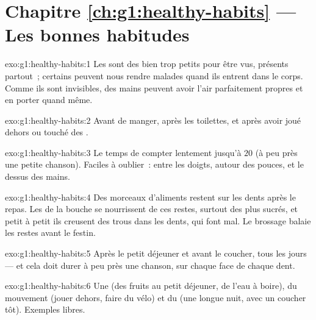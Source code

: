\section*{Chapitre \ref{ch:g1:healthy-habits} --- Les bonnes habitudes}

\begin{solution}{exo:g1:healthy-habits:1}
Les  sont des  bien trop petits pour être vus,
présents partout~; certains peuvent nous rendre malades quand ils
entrent dans le corps. Comme ils sont invisibles, des mains peuvent
avoir l'air parfaitement propres et en porter quand même.
\end{solution}

\begin{solution}{exo:g1:healthy-habits:2}
Avant de manger, après les toilettes, et après avoir joué dehors ou
touché des .
\end{solution}

\begin{solution}{exo:g1:healthy-habits:3}
Le temps de compter lentement jusqu'à $20$ (à peu près une petite
chanson). Faciles à oublier~: entre les doigts, autour des pouces,
et le dessus des mains.
\end{solution}

\begin{solution}{exo:g1:healthy-habits:4}
Des morceaux d'aliments restent sur les dents après le repas. Les
 de la bouche se nourrissent de ces restes, surtout des plus
sucrés, et petit à petit ils creusent des trous dans les dents, qui
font mal. Le brossage balaie les restes avant le festin.
\end{solution}

\begin{solution}{exo:g1:healthy-habits:5}
Après le petit déjeuner et avant le coucher, tous les jours --- et
cela doit durer à peu près une chanson, sur chaque face de chaque
dent.
\end{solution}

\begin{solution}{exo:g1:healthy-habits:6}
Une  (des fruits au petit déjeuner, de l'eau à
boire), du mouvement (jouer dehors, faire du vélo) et du 
(une longue nuit, avec un coucher tôt). Exemples libres.
\end{solution}

